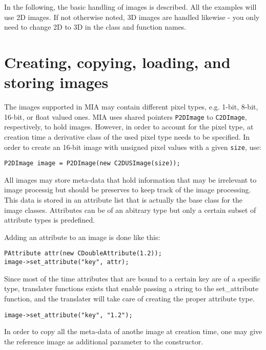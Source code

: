 \documentclass[english, 10pt, a4paper,headsepline,openany]{scrbook}
\begin{document}
\label{ch:images}

In the following, the basic handling of images is described. 
All the examples will use 2D images. 
If not otherwise noted, 3D images are handled likewise - you only need to change 2D to 3D in the 
  class and function names. 

\section{Creating, copying, loading, and storing images}

The images supported in MIA  may contain different pixel types, e.g. 1-bit, 8-bit, 16-bit, or float valued ones. 
MIA uses shared pointers \texttt{P2DImage} to \texttt{C2DImage}, respectively,  to hold images. 
However, in order to account for the pixel type, at creation time a derivative class of the used pixel 
   type needs to be specified. 
In order to create an 16-bit image with unsigned pixel values with a given \texttt{size}, use:

\lstset{numbers=none}
\begin{lstlisting}
P2DImage image = P2DImage(new C2DUSImage(size)); 
\end{lstlisting}

All images may store meta-data that hold information that may be irrelevant to image processig 
  but should be preserves to keep track of the image processing. 
This data is stored in an attribute list that is actually the base class for the image classes. 
Attributes can be of an abitrary type but only a certain subset of attribute types is predefined. 

Adding an attribute to an image is done like this: 
\begin{lstlisting}
PAttribute attr(new CDoubleAttribute(1.2));  
image->set_attribute("key", attr);
\end{lstlisting}

Since most of the time attributes that are bound to a certain key are of a specific type, 
  translater functions exists that enable passing a string to the set\_attribute function,  
  and the translater will take care of creating the proper attribute type. 
\begin{lstlisting}
image->set_attribute("key", "1.2");
\end{lstlisting}


In order to copy all the meta-data of anothe image at creation time, one may give the reference image 
  as additional parameter to the constructor.
\end{document}

